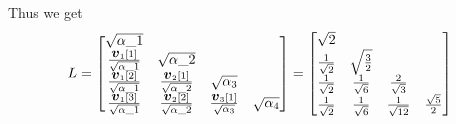 \begin{example}
Thus we get
\[
L= \begin{bmatrix}
\sqrt{\alpha\_1} \\
{\bm{{\mbox{\boldmath$v$\unboldmath}}}_1[1] \over \sqrt{\alpha\_1}} & \sqrt{\alpha\_2} \\
{\bm{{\mbox{\boldmath$v$\unboldmath}}}_1[2] \over \sqrt{\alpha\_1}} & {\bm{{\mbox{\boldmath$v$\unboldmath}}}_2[1] \over \sqrt{\alpha\_2}}  & \sqrt{\alpha_3} \\
{\bm{{\mbox{\boldmath$v$\unboldmath}}}_1[3] \over \sqrt{\alpha\_1}} & {\bm{{\mbox{\boldmath$v$\unboldmath}}}_2[2] \over \sqrt{\alpha\_2}}  & {\bm{{\mbox{\boldmath$v$\unboldmath}}}_3[1] \over \sqrt{\alpha_3}}  & \sqrt{\alpha_4}
\end{bmatrix}
 = \begin{bmatrix} \sqrt{2} \\ {1 \over \sqrt{2}} & \sqrt{3 \over 2} \\ 
{1 \over \sqrt{2}} & {1 \over \sqrt 6} & {2 \over \sqrt{3}} \\
{1 \over \sqrt{2}} & {1 \over \sqrt 6} & {1 \over \sqrt{12}} & {\sqrt{5} \over 2}
\end{bmatrix}
\]
\end{example}



